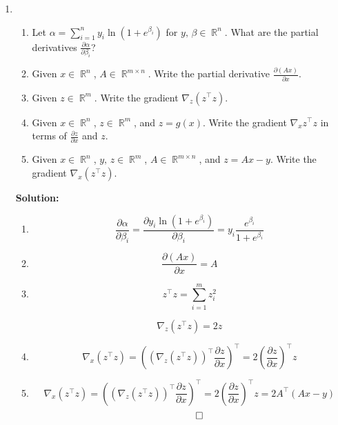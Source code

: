 \documentclass{article}
\DeclareMathOperator{\R}{\mathbb{R}}
\newenvironment{solution}{\color{blue} \smallskip \textbf{Solution:}}{}
\begin{document}
\begin{enumerate}
    \item 
    \begin{enumerate}
        \item
        Let $\alpha = \sum\limits_{i=1}^n y_i \ln{(1 + e^{\beta_i})}$ for $y,\, \beta \in \R^n$.
        What are the partial derivatives $\frac{\partial \alpha}{\partial \beta_i}$?
        \item 
        Given $x \in \R^n$, $A \in \R^{m \times n}$.
        Write the partial derivative $\frac{\partial (Ax)}{\partial x}$.
        \item
        Given $z \in \R^m$.
        Write the gradient $\nabla_z (z^\top z)$.
        \item
        Given $x \in \R^n$, $z \in \R^m$, and $z = g(x)$.
        Write the gradient $\nabla_x z^\top z$ in terms of $\frac{\partial z}{\partial x}$ and $z$.
        \item
        Given $x \in \R^n$, $y,\, z \in \R^m$, $A \in \R^{m \times n}$, and $z = Ax - y$.
        Write the gradient $\nabla_x (z^\top z)$.
    \end{enumerate}
    
    \begin{solution}
        \begin{enumerate}
            \item 
            $$
            \frac{\partial \alpha}{\partial \beta_i} = \frac{\partial y_i \ln{(1 + e^{\beta_i})}}{\partial \beta_i}=y_i\frac{e^{\beta_i}}{1+e^{\beta_i}}
            $$
            \item
            $$
            \frac{\partial (Ax)}{\partial x} = A
            $$
            \item 
            $$
            z^\top z = \sum_{i=1}^m z_i^2
            $$

            $$
            \nabla_z (z^\top z) = 2z
            $$
            \item
            $$
            \nabla_x (z^\top z) = ((\nabla_z (z^\top z))^\top\frac{\partial z}{\partial x})^\top=
            2(\frac{\partial z}{\partial x})^\top z
            $$
            \item
            $$
            \nabla_x (z^\top z) = ((\nabla_z (z^\top z))^\top\frac{\partial z}{\partial x})^\top=
            2(\frac{\partial z}{\partial x})^\top z = 2A^\top (Ax-y)
            $$
            \[ \qedhere \]
        \end{enumerate}
    \end{solution}

\end{enumerate}
\end{document}
